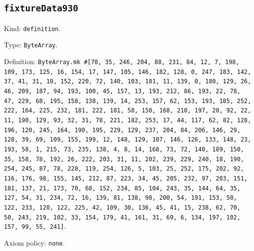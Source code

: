 \documentclass[11pt]{article}
\begin{document}
\subsection*{\texttt{fixtureData930}}
\noindent Kind: \texttt{definition}.\par
\noindent Type: \texttt{ByteArray}.\par
\noindent Definition: \texttt{ByteArray.mk \#[70, 35, 246, 204, 88, 231, 84, 12, 7, 198, 109, 173, 125, 16, 154, 17, 147, 105, 146, 182, 128, 0, 247, 183, 142, 37, 41, 31, 10, 152, 220, 72, 140, 103, 181, 11, 139, 0, 180, 129, 26, 46, 209, 187, 94, 193, 100, 45, 157, 13, 193, 212, 86, 193, 22, 78, 47, 229, 68, 195, 158, 138, 139, 14, 253, 157, 62, 153, 193, 185, 252, 222, 164, 225, 232, 181, 222, 181, 58, 150, 168, 210, 197, 20, 92, 22, 11, 190, 129, 93, 32, 31, 78, 221, 182, 253, 17, 44, 117, 62, 82, 128, 196, 120, 245, 164, 190, 195, 229, 129, 237, 204, 84, 206, 146, 29, 128, 39, 69, 109, 155, 199, 12, 148, 129, 107, 146, 126, 133, 148, 23, 193, 58, 1, 215, 73, 235, 138, 4, 8, 14, 168, 73, 72, 140, 189, 150, 35, 158, 78, 192, 26, 222, 203, 31, 11, 202, 239, 229, 240, 18, 190, 254, 245, 87, 78, 228, 119, 254, 126, 5, 103, 25, 252, 175, 202, 92, 116, 176, 98, 155, 145, 212, 87, 223, 34, 45, 205, 232, 97, 203, 151, 181, 137, 21, 173, 70, 68, 152, 234, 85, 104, 243, 35, 144, 64, 35, 127, 54, 31, 234, 72, 16, 139, 81, 138, 98, 200, 54, 191, 153, 50, 122, 233, 120, 122, 225, 42, 109, 30, 136, 45, 41, 15, 238, 62, 70, 50, 243, 219, 102, 33, 154, 179, 41, 161, 31, 69, 6, 134, 197, 102, 157, 99, 55, 241]}.\par
\noindent Axiom policy: \texttt{none}.\par
\end{document}
